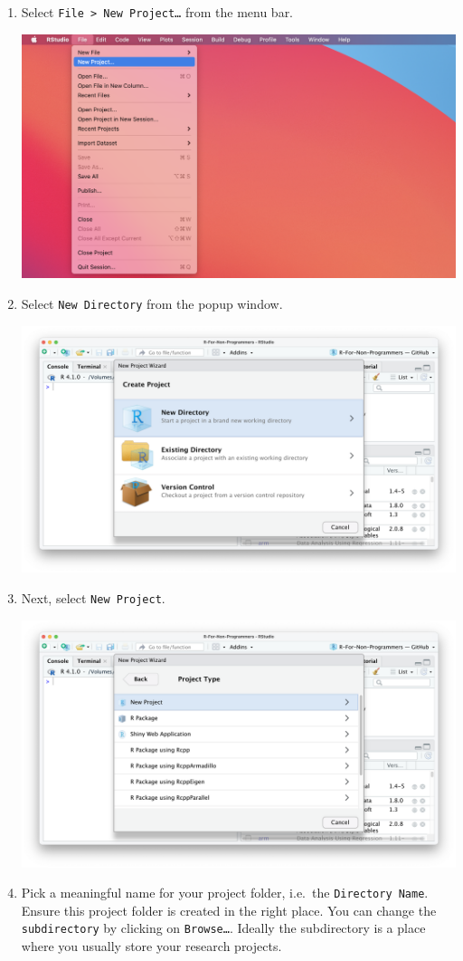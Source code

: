 \documentclass[
  letterpaper,
]{krantz}
\begin{document}
\begin{enumerate}
\def\labelenumi{\arabic{enumi}.}
\item
  Select \texttt{File\ \textgreater{}\ New\ Project…} from the menu bar.

  \includegraphics{images/chapter_06_img/00_r_project/00_r_project_file_menu.png}
\item
  Select \texttt{New\ Directory} from the popup window.

  \includegraphics{images/chapter_06_img/00_r_project/01_r_project_new_directory.png}
\item
  Next, select \texttt{New\ Project}.

  \includegraphics{images/chapter_06_img/00_r_project/02_r_project_new_project.png}
\item
  Pick a meaningful name for your project folder, i.e.~the
  \texttt{Directory\ Name}. Ensure this project folder is created in the
  right place. You can change the \texttt{subdirectory} by clicking on
  \texttt{Browse…}. Ideally the subdirectory is a place where you
  usually store your research projects.


\end{enumerate}
\end{document}
